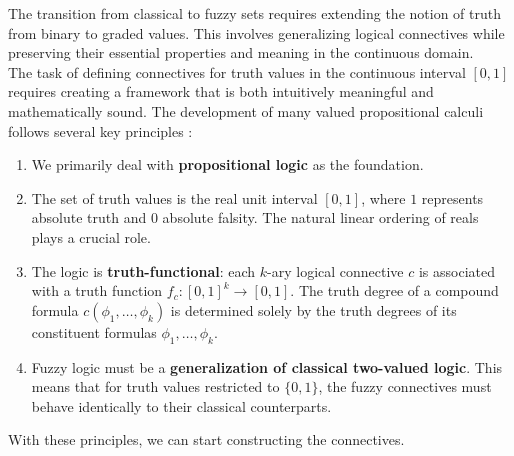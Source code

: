 The transition from classical to fuzzy sets requires extending the notion of truth from binary to graded values. This involves generalizing logical connectives while preserving their essential properties and meaning in the continuous domain.
\\

The task of defining connectives for truth values in the continuous interval $[0,1]$ requires creating a framework that is both intuitively meaningful and mathematically sound. The development of many valued propositional calculi follows several key principles \cite[p.27]{Hajek1998}:
\begin{enumerate}
    \item We primarily deal with \textbf{propositional logic} as the foundation.
    \item The set of truth values is the real unit interval $[0,1]$, where $1$ represents absolute truth and $0$ absolute falsity. The natural linear ordering of reals plays a crucial role.
    \item The logic is \textbf{truth-functional}: each $k$-ary logical connective $c$ is associated with a truth function $f_c: [0,1]^k \to [0,1]$. The truth degree of a compound formula $c(\phi_1, \dots, \phi_k)$ is determined solely by the truth degrees of its constituent formulas $\phi_1, \dots, \phi_k$.
    \item Fuzzy logic must be a \textbf{generalization of classical two-valued logic}. This means that for truth values restricted to $\{0,1\}$, the fuzzy connectives must behave identically to their classical counterparts.
\end{enumerate}
With these principles, we can start constructing the connectives.

